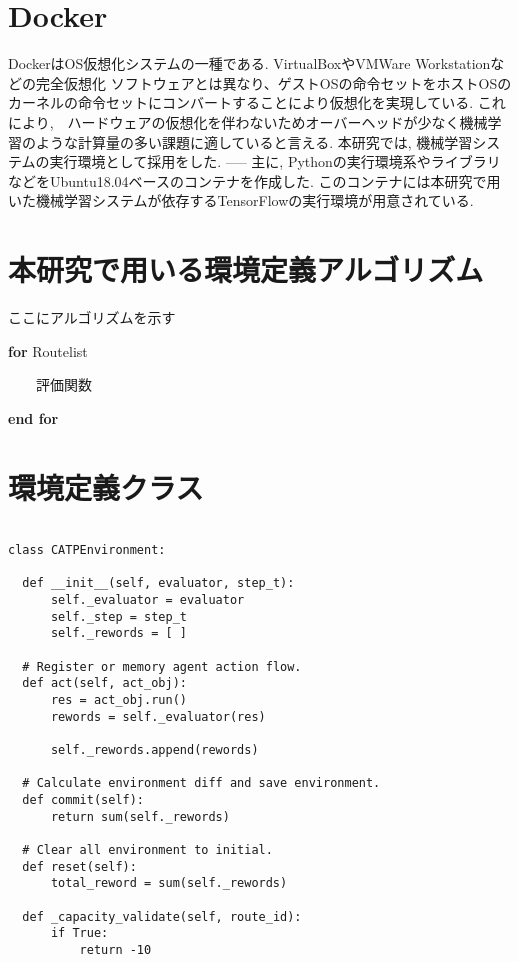 \section{Docker}

DockerはOS仮想化システムの一種である. VirtualBoxやVMWare Workstationなどの完全仮想化
ソフトウェアとは異なり、ゲストOSの命令セットをホストOSのカーネルの命令セットにコンバートすることにより仮想化を実現している.
これにより,　ハードウェアの仮想化を伴わないためオーバーヘッドが少なく機械学習のような計算量の多い課題に適していると言える.
本研究では, 機械学習システムの実行環境として採用をした.
-----
主に, Pythonの実行環境系やライブラリなどをUbuntu18.04ベースのコンテナを作成した.
このコンテナには本研究で用いた機械学習システムが依存するTensorFlowの実行環境が用意されている.

\section{本研究で用いる環境定義アルゴリズム}

ここにアルゴリズムを示す

\textbf{for} Routelist

\ \ \ \ 評価関数

\textbf{end for}


\section{環境定義クラス}

\begin{lstlisting}[caption = 環境を構築するクラス, label = program1]

class CATPEnvironment:

  def __init__(self, evaluator, step_t):
      self._evaluator = evaluator
      self._step = step_t
      self._rewords = [ ]

  # Register or memory agent action flow.
  def act(self, act_obj):
      res = act_obj.run()
      rewords = self._evaluator(res)

      self._rewords.append(rewords)
  
  # Calculate environment diff and save environment.
  def commit(self):
      return sum(self._rewords)
  
  # Clear all environment to initial.
  def reset(self):
      total_reword = sum(self._rewords)

  def _capacity_validate(self, route_id):
      if True:
          return -10
\end{lstlisting}
  




